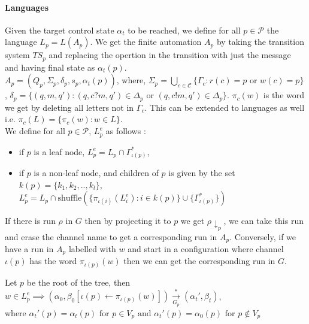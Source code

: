 \documentclass[a4paper,UKenglish,cleveref, autoref, thm-restate]{lipics-v2019}
\begin{document}
\paragraph*{Languages}

\hspace*{0.5cm}Given the target control state $\alpha_t$  to be reached, we define for all $p \in \mathcal{P}$ the language $L_p = L(A_p)$. We get the finite automation $A_p$ by taking the transition system $TS_p$ and replacing the opertion in the transition with just the message and having final state as $\alpha_t(p)$. \\
\hspace{5cm} $A_p= (Q_p, \Sigma_p, \delta_p, s_p, \alpha_t(p))$, 
where, $\Sigma_p = \bigcup\limits_{c \in \mathcal{C}} \{ \Gamma_c : r(c) = p \text{ or } w(c) = p\}$ , $\delta_p = \{(q, m, q') : (q, c?m, q') \in \Delta_p \text{ or } (q, c!m, q') \in \Delta_p\}$. $\pi_c(w)$ is the word we get by deleting all letters not in $\Gamma_c$. This can be extended to languages as well i.e. $\pi_c(L) = \{ \pi_c(w) : w \in L\}$.\\
\hspace*{0.5cm}We define for all $p \in \mathcal{P}$, $L_p^e$ as follows : 
\begin{itemize}
    \item if $p$ is a leaf node, $L_p^e = L_p \cap \Gamma_{\iota(p)}^*$,
    \item if $p$ is a non-leaf node, and children of $p$ is given by the set $k(p) = \{k_1, k_2, .., k_l\}$, $L_p^e = L_p \cap \text{shuffle}(\{ \pi_{\iota(i)}(L_i^e)  : i \in k(p)\} \cup \{\Gamma_{\iota(p)}^*\})$
\end{itemize}
\hspace*{0.5cm}If there is run $\rho$ in $G$ then by projecting it to $p$ we get $\rho \downarrow_p$, we can take this run and erase the channel name to get a corresponding run in $A_p$. Conversely, if we have a run in $A_p$ labelled with $w$ and start in a configuration where channel $\iota(p)$ has the word $\pi_{\iota(p)}(w)$ then we can get the corresponding run in $G$.
    



\begin{lemma}\label{testenv-lemma}

Let $p$ be the root of the tree, then \\
\hspace*{2cm}$w \in L_p^e \implies (\alpha_0, \beta_0[\iota(p) \leftarrow \pi_{\iota(p)}(w) ]) \xrightarrow[G_p]{*} (\alpha_t', \beta_t)$, \\
where $\alpha_t'(p) = \alpha_t(p) \text{ for } p \in V_p  \text{ and } \alpha_t'(p) = \alpha_0(p) \text{ for } p \notin V_p$
\end{lemma}
   
\end{document}

